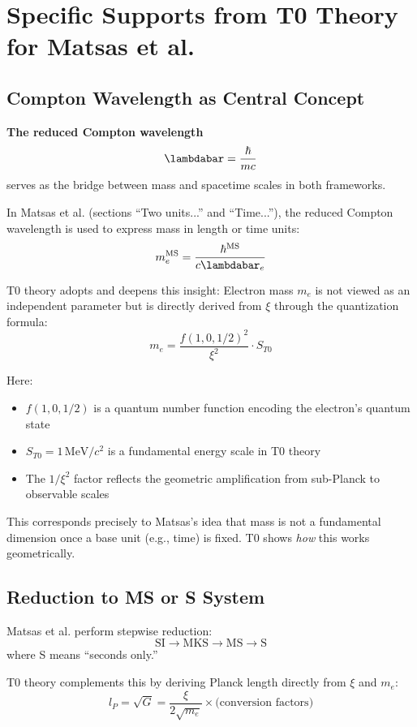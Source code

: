 	\section{Specific Supports from T0 Theory for Matsas et al.}
	
	\subsection{Compton Wavelength as Central Concept}
	
	\begin{keyresult}
		\textbf{The reduced Compton wavelength}
		\[
		\lambdabar = \frac{\hbar}{m c}
		\]
		serves as the bridge between mass and spacetime scales in both frameworks.
	\end{keyresult}
	
	In Matsas et al. (sections ``Two units...'' and ``Time...''), the reduced Compton wavelength is used to express mass in length or time units:
	\[
	m_e^{\text{MS}} = \frac{\hbar^{\text{MS}}}{c \lambdabar_e}
	\]
	
	T0 theory adopts and deepens this insight: Electron mass $m_e$ is not viewed as an independent parameter but is directly derived from $\xi$ through the quantization formula:
	\[
	m_e = \frac{f(1,0,1/2)^2}{\xi^2} \cdot S_{T0}
	\]
	
	Here:
	\begin{itemize}
		\item $f(1,0,1/2)$ is a quantum number function encoding the electron's quantum state
		\item $S_{T0} = 1\,\text{MeV}/c^2$ is a fundamental energy scale in T0 theory
		\item The $1/\xi^2$ factor reflects the geometric amplification from sub-Planck to observable scales
	\end{itemize}
	
	This corresponds precisely to Matsas's idea that mass is not a fundamental dimension once a base unit (e.g., time) is fixed. T0 shows \emph{how} this works geometrically.
	
	\subsection{Reduction to MS or S System}
	
	Matsas et al. perform stepwise reduction:
	\[
	\text{SI} \to \text{MKS} \to \text{MS} \to \text{S}
	\]
	where S means ``seconds only.''
	
	T0 theory complements this by deriving Planck length directly from $\xi$ and $m_e$:
	\[
	l_P = \sqrt{G} = \frac{\xi}{2\sqrt{m_e}} \times \text{(conversion factors)}
	\]
	
